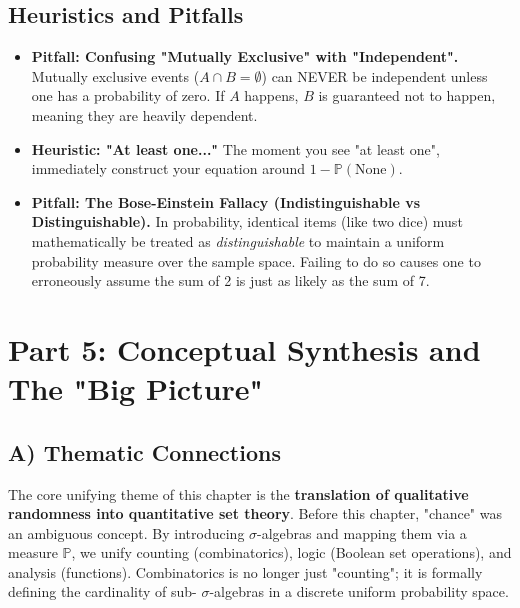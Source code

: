 \documentclass[11pt, letterpaper]{article}
\theoremstyle{definition}
\theoremstyle{remark}
\newcommand{\Prob}{\mathbb{P}}
\begin{document}
\subsection{Heuristics and Pitfalls}
\begin{itemize}
    \item \textbf{Pitfall: Confusing "Mutually Exclusive" with "Independent".} Mutually exclusive events ($A \cap B = \emptyset$) can NEVER be independent unless one has a probability of zero. If $A$ happens, $B$ is guaranteed not to happen, meaning they are heavily dependent.
    \item \textbf{Heuristic: "At least one..."} The moment you see "at least one", immediately construct your equation around $1 - \Prob(\text{None})$.
    \item \textbf{Pitfall: The Bose-Einstein Fallacy (Indistinguishable vs Distinguishable).} In probability, identical items (like two dice) must mathematically be treated as \textit{distinguishable} to maintain a uniform probability measure over the sample space. Failing to do so causes one to erroneously assume the sum of 2 is just as likely as the sum of 7.
\end{itemize}

\newpage
\section{Part 5: Conceptual Synthesis and The "Big Picture"}

\subsection{A) Thematic Connections}
The core unifying theme of this chapter is the \textbf{translation of qualitative randomness into quantitative set theory}. Before this chapter, "chance" was an ambiguous concept. By introducing $\sigma$-algebras and mapping them via a measure $\Prob$, we unify counting (combinatorics), logic (Boolean set operations), and analysis (functions). Combinatorics is no longer just "counting"; it is formally defining the cardinality of sub- $\sigma$-algebras in a discrete uniform probability space.
\end{document}
